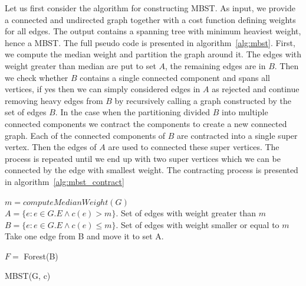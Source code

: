 \documentclass[runningheads, a4paper]{llncs}
\begin{document}
Let us first consider the algorithm for constructing MBST. As input, we provide a connected and undirected graph together with a cost function defining weights for all edges. The output contains a spanning tree with minimum heaviest weight, hence a MBST. The full pseudo code is presented in algorithm~\ref{alg:mbst}. First, we compute the median weight and partition the graph around it. The edges with weight greater than median are put to set $A$, the remaining edges are in $B$. Then we check whether $B$ contains a single connected component and spans all vertices, if yes then we can simply considered edges in $A$ as rejected and continue removing heavy edges from $B$ by recursively calling a graph constructed by the set of edges $B$. In the case when the partitioning divided $B$ into multiple connected components we contract the components to create a new connected graph. Each of the connected components of $B$ are contracted into a single super vertex. Then the edges of $A$ are used to connected these super vertices. The process is repeated until we end up with two super vertices which we can be connected by the edge with smallest weight.
The contracting process is presented in algorithm~\ref{alg:mbst_contract}
        
\begin{algorithm}[H]
    
    
    $m = computeMedianWeight(G)$ \\
    $A = \{e : {e {\in G.E}} \land c(e) > m \}$. Set of edges with weight greater than $m$ \\
    $B = \{e : {e{\in G.E}} \land c(e) \leq m \}$. Set of edges with weight smaller or equal to $m$ \\
        {
            Take one edge from B and move it to set A.\\			
        }     
    
    $F =$ Forest(B) \\
    
    
    \caption{MBST(G, c)}
    \label{alg:mbst}
\end{algorithm}
\end{document}
